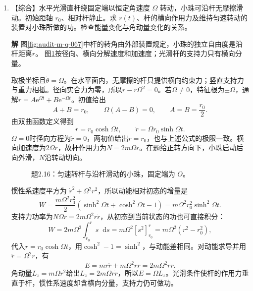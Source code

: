 \documentclass[11pt,openany,fontset=fandol]{ctexbook}
\theoremstyle{plain}\newtheorem{theorem}{定理}[chapter]\newtheorem{proposition}[theorem]{命题}
\theoremstyle{definition}\newtheorem{definition}{定义}[chapter]\newtheorem{example}{例}[chapter]
\theoremstyle{remark}\newtheorem*{remark}{说明}
\newcommand{\SolutionStart}{\par\nobreak\medskip\nobreak\noindent\textbf{解}\quad\ignorespaces}
\newenvironment{solution}{\SolutionStart}{\par\medskip}
\newcommand{\dd}{\mathop{}\!\mathrm d}\newcommand{\ii}{\mathrm i}\newcommand{\ee}{\mathrm e}
\newcommand{\vct}[1]{\bm{#1}}\newcommand{\Rea}{\operatorname{Re}}\newcommand{\Ima}{\operatorname{Im}}
\begin{document}
\begin{enumerate}[label=2.\arabic*]
\item \begin{minipage}[t]{\linewidth}
【综合】水平光滑直杆绕固定端以恒定角速度 $\Omega$ 转动，小珠可沿杆无摩擦滑动。初始距轴 $r_0$、相对杆静止。求 $r(t)$、杆的横向作用力及维持匀速转动的装置对小珠所做的功。检查能量变化与角动量变化的关系。

\end{minipage}

\begin{solution}
图\ref{fig:audit-m-q-067}中杆的转角由外部装置规定，小珠的独立自由度是沿杆距离$r$。
图\ref{fig:ex-2-16}按径向、横向分解速度和加速度；光滑杆的支持力只有横向分量。

取极坐标且$\dot\theta=\Omega$。在水平面内，无摩擦的杆只提供横向约束力；竖直支持力与重力相抵。径向实合力为零，所以$\ddot r-r\Omega^2=0$。若$\Omega\ne0$，特征根为$\pm\Omega$，通解$r=A\ee^{\Omega t}+B\ee^{-\Omega t}$。初值给出
\[A+B=r_0,\qquad\Omega(A-B)=0,\qquad A=B=\frac{r_0}{2}.\]
由双曲函数定义得到
\[
r=r_0\cosh\Omega t,\qquad\dot r=\Omega r_0\sinh\Omega t.
\]
$\Omega=0$时径向方程为$\ddot r=0$，两初值给出$r=r_0$，也与上述公式的极限一致。横向加速度为$2\Omega\dot r$，故杆作用力为$N=2m\Omega\dot r$。在题给正转方向下，小珠启动后向外滑，$N$沿转动切向。

\begin{figure}[H]\centering
{}
\caption{题2.16：匀速转杆与沿杆滑动的小珠，固定端为 $O$。}\label{fig:ex-2-16}
\end{figure}

惯性系速度平方为 $\dot r^2+\Omega^2r^2$，所以动能相对初态的增量是
\[
W=\frac{m\Omega^2r_0^2}{2}(\sinh^2\Omega t+\cosh^2\Omega t-1)
=m\Omega^2r_0^2\sinh^2\Omega t.
\]
支持力功率为$N\Omega r=2m\Omega^2r\dot r$，从初态到当前状态的功也可直接积分：
\[W=2m\Omega^2\int_{r_0}^{r}s\dd s
=m\Omega^2[s^2]_{r_0}^{r}
=m\Omega^2(r^2-r_0^2),\]
代入$r=r_0\cosh\Omega t$，用$\cosh^2-1=\sinh^2$，与动能差相同。对动能求导并用$\ddot r=\Omega^2r$，有
\[\dot E=m\dot r\ddot r+m\Omega^2r\dot r
=2m\Omega^2r\dot r.\]
角动量$L_z=m\Omega r^2$给出$\dot L_z=2m\Omega r\dot r$，所以$\dot E=\Omega\dot L_z$。光滑条件使杆的作用力垂直于杆，惯性系速度却含横向分量，支持力仍可做功。


\end{solution}
\end{enumerate}
\end{document}
